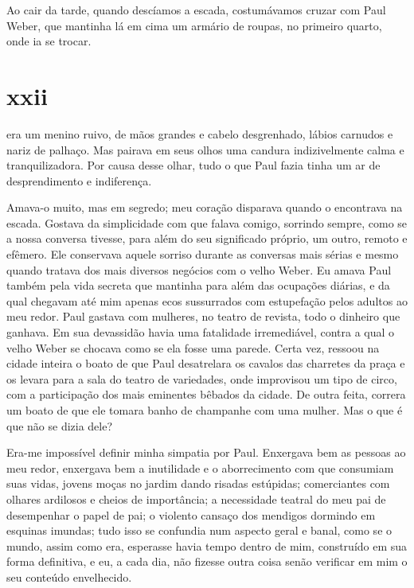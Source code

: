 Ao cair da tarde, quando descíamos a escada, costumávamos cruzar com Paul
Weber, que mantinha lá em cima um armário de roupas, no primeiro quarto, onde
ia se trocar.


\section{xxii} 

 era um menino ruivo, de mãos grandes e cabelo desgrenhado,
 lábios carnudos e nariz de palhaço. Mas pairava em seus olhos uma candura
 indizivelmente calma e tranquilizadora. Por causa desse olhar, tudo o que
 Paul fazia tinha um ar de desprendimento e indiferença.

Amava-o muito, mas em segredo; meu coração disparava quando o encontrava na
escada. Gostava da simplicidade com que falava comigo, sorrindo sempre, como
se a nossa conversa tivesse, para além do seu significado próprio, um outro,
remoto e efêmero. Ele conservava aquele sorriso durante as conversas mais
sérias e mesmo quando tratava dos mais diversos negócios com o velho Weber.
Eu amava Paul também pela vida secreta que mantinha para além das ocupações
diárias, e da qual chegavam até mim apenas ecos sussurrados com estupefação
pelos adultos ao meu redor. Paul gastava com mulheres, no teatro de revista,
todo o dinheiro que ganhava. Em sua devassidão havia uma fatalidade
irremediável, contra a qual o velho Weber se chocava como se ela fosse uma
parede. Certa vez, ressoou na cidade inteira o boato de que Paul desatrelara
os cavalos das charretes da praça e os levara para a sala do teatro de
variedades, onde improvisou um tipo de circo, com a participação dos mais
eminentes bêbados da cidade. De outra feita, correra um boato de que ele
tomara banho de champanhe com uma mulher. Mas o que é que não se dizia
dele? 

Era-me impossível definir minha simpatia por Paul. Enxergava bem as pessoas ao
meu redor, enxergava bem a inutilidade e o aborrecimento com que consumiam
suas vidas, jovens moças no jardim dando risadas estúpidas; comerciantes com
olhares ardilosos e cheios de importância; a necessidade teatral do meu pai
de desempenhar o papel de pai; o violento cansaço dos mendigos dormindo em
esquinas imundas; tudo isso se confundia num aspecto geral e banal, como se o
mundo, assim como era, esperasse havia tempo dentro de mim, construído em sua
forma definitiva, e eu, a cada dia, não fizesse outra coisa senão verificar
em mim o seu conteúdo envelhecido.

